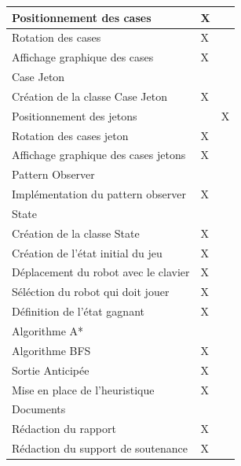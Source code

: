 \documentclass[a4paper, 12pt]{article}
\begin{document}
\begin{center}
\begin{tabular}{|p{7cm}|>{\centering\arraybackslash}p{4cm}|>{\centering\arraybackslash}p{4cm}|}
                 \hline
                 Positionnement des cases & X & \\
                  \hline
                Rotation des cases & X & \\
                \hline
                 Affichage graphique des cases & X & \\
            \hline %
                \rowcolor{ashgrey} Case Jeton   & &\\
                Création de la classe Case Jeton & X & \\
                \hline
                Positionnement des jetons & & X\\
                \hline
                Rotation des cases jeton & X & \\
                 \hline
                Affichage graphique des cases jetons & X & \\
            \hline %
                \rowcolor{ashgrey} Pattern Observer  & &\\
                Implémentation du pattern observer & X & \\   
            \hline %
                \rowcolor{ashgrey} State & &\\
                 Création de la classe State & X & \\
                 \hline
                Création de l'état initial du jeu & X & \\   
                \hline
                Déplacement du robot avec le clavier & X &\\
                \hline
                Séléction du robot qui doit jouer & X &\\
                \hline
                Définition de l'état gagnant & X &\\
            \hline %
             \rowcolor{ashgrey} Algorithme A* & &\\
                Algorithme BFS & X & \\   
                \hline
                 Sortie Anticipée & X &\\  
                \hline
                 Mise en place de l'heuristique & X &\\  
                \hline
             \hline %
             \rowcolor{ashgrey} Documents & &\\
             Rédaction du rapport & X & \\
             \hline
             Rédaction du support de soutenance & X & \\
            \hline %
        \end{tabular}
    \end{center}
    
\end{document}
